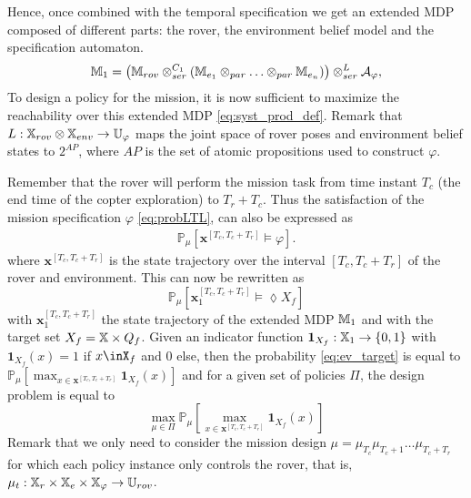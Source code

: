 \documentclass[conference]{IEEEtran}
\begin{document}
 Hence, once combined with the temporal specification we get an extended MDP  
 composed of different parts: the rover, the environment belief model and the specification automaton.
 \begin{equation}
\label{eq:syst_prod_def}
\begin{aligned}
	\MDP_1 & = \left( \MDP_{rov} \otimes_{ser}^{C_1} \left( \MDP_{e_1} \otimes_{par} \ldots \otimes_{par} \MDP_{e_n} \right) \right) \otimes_{ser}^{L} \mathcal A_{\varphi}, \\
	\end{aligned}
\end{equation}
To design a policy for the mission, it is now sufficient to maximize the reachability over this extended MDP \eqref{eq:syst_prod_def}.
Remark that $L : \mathbb{X}_{rov} \otimes \mathbb{X}_{env} \rightarrow \mathbb{U}_{\varphi}$ maps the joint space of rover poses and environment belief states to $2^{AP}$, where $AP$ is the set of atomic propositions used to construct $\varphi$.

Remember that the rover will perform the mission task from time instant $T_c$ (the end time of the copter exploration) to  $T_r + T_c$.  Thus the satisfaction of the mission specification $\varphi$ \eqref{eq:probLTL}, can also be expressed as
\begin{equation}
\begin{aligned}
\mathbb{P}_{\mu} \left[ \mathbf{x}^{[T_c,T_c+T_r]} \models \varphi \right].
\end{aligned}
\end{equation}
where $\mathbf{x}^{[T_c,T_c+T_r]}$ is the state trajectory over the interval $[T_c,T_c+T_r]$ of the rover and environment.
This can now be rewritten as 
\begin{equation}\label{eq:ev_target}\mathbb{P}_{\mu} \left[ \mathbf{x}^{[T_c,T_c+T_r]}_1 \models \lozenge X_f \right]\end{equation} with  $\mathbf{x}^{[T_c,T_c+T_r]}_1$  the state trajectory of the extended MDP $\mathbb{M}_1$ and with the target set $X_f=\mathbb{X}\times Q_f$.
Given an indicator function $\mathbf 1_{X_f}:\mathbb{X}_1\rightarrow\{0,1\}$ with  $ \mathbf 1_{X_f}(x) =1 $ if $x\inX_f$ and $0$ else, then the probability \eqref{eq:ev_target} is equal to \(\mathbb{P}_{\mu} \left[\max_{x\in \mathbf{x}^{[T_c,T_c+T_r]}} \mathbf 1_{X_f}(x) \right]\)
and for a given set of policies $\Pi$, the design problem is equal to 
 \begin{equation}\label{eq:optmission}\max_{\mu\in \Pi}\mathbb{P}_{\mu} \left[\max_{x\in \mathbf{x}^{[T_c,T_c+T_r]}} \mathbf 1_{X_f}(x) \right]\end{equation}
Remark that we only need to consider the mission design $\mu=\mu_{T_c}\mu_{T_c+1}\ldots \mu_{T_c+T_r}$ for which each policy instance only controls the rover, that is, $\mu_{t}:\mathbb{X}_r\times\mathbb{X}_e\times\mathbb{X}_\varphi\rightarrow \mathbb{U}_{rov}$.
\end{document}

